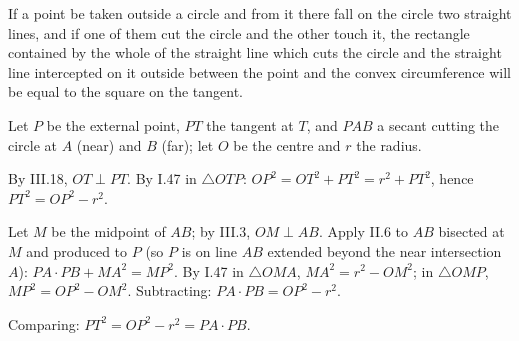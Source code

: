 \documentclass{rrxiv}
\begin{document}
\begin{claim}
\label{prop:III.36}
If a point be taken outside a circle and from it there fall on the
circle two straight lines, and if one of them cut the circle and the
other touch it, the rectangle contained by the whole of the straight
line which cuts the circle and the straight line intercepted on it
outside between the point and the convex circumference will be equal
to the square on the tangent.
\end{claim}
\begin{evidence}
\label{ev:III.36}

Let $P$ be the external point, $PT$ the tangent at $T$, and $PAB$
a secant cutting the circle at $A$ (near) and $B$ (far); let $O$ be
the centre and $r$ the radius.

By III.18, $OT \perp PT$.  By I.47 in $\triangle OTP$: $OP^2 =
OT^2 + PT^2 = r^2 + PT^2$, hence $PT^2 = OP^2 - r^2$.

Let $M$ be the midpoint of $AB$; by III.3, $OM \perp AB$.  Apply
II.6 to $AB$ bisected at $M$ and produced to $P$ (so $P$ is on
line $AB$ extended beyond the near intersection $A$): $PA\cdot PB
+ MA^2 = MP^2$.  By I.47 in $\triangle OMA$, $MA^2 = r^2 - OM^2$;
in $\triangle OMP$, $MP^2 = OP^2 - OM^2$.  Subtracting:
$PA\cdot PB = OP^2 - r^2$.

Comparing: $PT^2 = OP^2 - r^2 = PA\cdot PB$.
\end{evidence}
\end{document}

